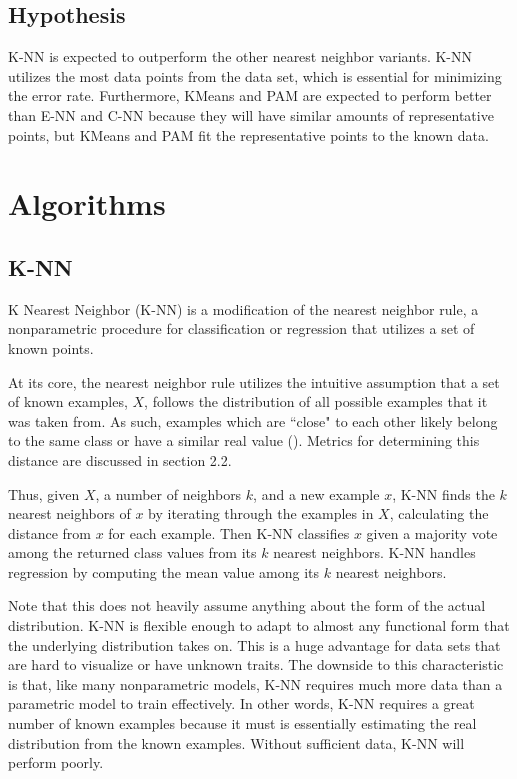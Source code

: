 \documentclass[twoside,11pt]{article}
\begin{document}
\subsection*{Hypothesis}

K-NN is expected to outperform the other nearest neighbor variants. K-NN utilizes the most data points from the data set, which is essential for minimizing the error rate. Furthermore, KMeans and PAM are expected to perform better than E-NN and C-NN because they will have similar amounts of representative points, but KMeans and PAM fit the representative points to the known data.

\section{Algorithms}

\subsection{K-NN}

K Nearest Neighbor (K-NN) is a modification of the nearest neighbor rule, a nonparametric procedure for classification or regression that utilizes a set of known points.

At its core, the nearest neighbor rule utilizes the intuitive assumption that a set of known examples, $X$, follows the distribution of all possible examples that it was taken from. As such, examples which are ``close" to each other likely belong to the same class or have a similar real value (\cite{NNClassification}). Metrics for determining this distance are discussed in section 2.2.

Thus, given $X$, a number of neighbors $k$, and a new example $x$, K-NN finds the $k$ nearest neighbors of $x$ by iterating through the examples in $X$, calculating the distance from $x$ for each example. Then K-NN classifies $x$ given a majority vote among the returned class values from its $k$ nearest neighbors. K-NN handles regression by computing the mean value among its $k$ nearest neighbors.

Note that this does not heavily assume anything about the form of the actual distribution. K-NN is flexible enough to adapt to almost any functional form that the underlying distribution takes on. This is a huge advantage for data sets that are hard to visualize or have unknown traits. The downside to this characteristic is that, like many nonparametric models, K-NN requires much more data than a parametric model to train effectively. In other words, K-NN requires a great number of known examples because it must is essentially estimating the real distribution from the known examples. Without sufficient data, K-NN will perform poorly.
\end{document}
